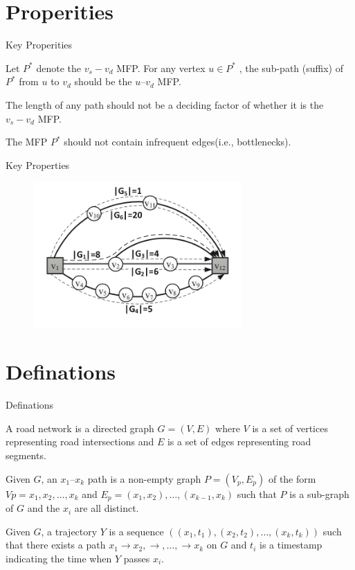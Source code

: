 \documentclass[mathserif]{beamer}
\begin{document}
\section{Properities}
\begin{frame}{Key Properities}
	\begin{property}
	Let $P^*$ denote the $v_s-v_d$ MFP. For any vertex $u \in P^*$ , the sub-path (suffix) of $P^*$ from $u$ to $v_d$ should be the $u–v_d$ MFP.
	\end{property}
	\begin{property}
	The length of any path should not be a deciding factor of whether it is the $v_s-v_d$ MFP.
	\end{property}
	\begin{property}
	The MFP $P^*$ should not contain infrequent edges(i.e., bottlenecks).
	\end{property}
\end{frame}

\begin{frame}{Key Properties}
\begin{figure}
\includegraphics[width = 8cm]{pro.png}
\end{figure}
\end{frame}

\section{Definations}
\begin{frame}{Definations}
\begin{defination}
A road network is a directed graph $G = (V, E)$ where $V$ is a set of vertices representing road intersections and $E$ is a set of edges representing road segments.
\end{defination}
\begin{defination}
Given $G$, an $x_1–x_k$ path is a non-empty graph $P = (V_p, E_p)$ of the form $Vp = {x_1, x_2,\ldots{}, x_k}$ and $E_p = {(x_1, x_2),\ldots , (x_{k−1}, x_k)}$ such that $P$ is a sub-graph of $G$ and the $x_i$ are all distinct.
\end{defination}
\begin{defination}
Given $G$, a trajectory $Y$ is a sequence $((x_1, t_1), (x_2, t_2), \ldots , (x_k, t_k))$ such that there exists a path $x_1 \to{} x_2,\to{},\dots,\to{} x_k$ on $G$ and $t_i$ is a timestamp indicating the time when $Y$ passes $x_i$.
\end{defination}
\end{frame}
\end{document}
